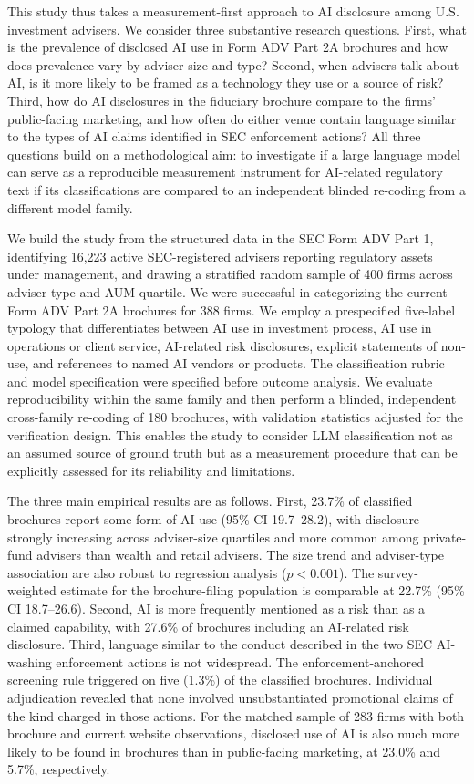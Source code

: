 \documentclass[utf8]{FrontiersinHarvard}
\begin{document}
This study thus takes a measurement-first approach to AI disclosure among U.S. investment advisers. We consider three substantive research questions. First, what is the prevalence of disclosed AI use in Form ADV Part 2A brochures and how does prevalence vary by adviser size and type? Second, when advisers talk about AI, is it more likely to be framed as a technology they use or a source of risk? Third, how do AI disclosures in the fiduciary brochure compare to the firms' public-facing marketing, and how often do either venue contain language similar to the types of AI claims identified in SEC enforcement actions? All three questions build on a methodological aim: to investigate if a large language model can serve as a reproducible measurement instrument for AI-related regulatory text if its classifications are compared to an independent blinded re-coding from a different model family.

We build the study from the structured data in the SEC Form ADV Part 1, identifying 16{,}223 active SEC-registered advisers reporting regulatory assets under management, and drawing a stratified random sample of 400 firms across adviser type and AUM quartile. We were successful in categorizing the current Form ADV Part 2A brochures for 388 firms. We employ a prespecified five-label typology that differentiates between AI use in investment process, AI use in operations or client service, AI-related risk disclosures, explicit statements of non-use, and references to named AI vendors or products. The classification rubric and model specification were specified before outcome analysis. We evaluate reproducibility within the same family and then perform a blinded, independent cross-family re-coding of 180 brochures, with validation statistics adjusted for the verification design. This enables the study to consider LLM classification not as an assumed source of ground truth but as a measurement procedure that can be explicitly assessed for its reliability and limitations.

The three main empirical results are as follows. First, 23.7\% of classified brochures report some form of AI use (95\% CI 19.7--28.2), with disclosure strongly increasing across adviser-size quartiles and more common among private-fund advisers than wealth and retail advisers. The size trend and adviser-type association are also robust to regression analysis ($p < 0.001$). The survey-weighted estimate for the brochure-filing population is comparable at 22.7\% (95\% CI 18.7--26.6). Second, AI is more frequently mentioned as a risk than as a claimed capability, with 27.6\% of brochures including an AI-related risk disclosure. Third, language similar to the conduct described in the two SEC AI-washing enforcement actions is not widespread. The enforcement-anchored screening rule triggered on five (1.3\%) of the classified brochures. Individual adjudication revealed that none involved unsubstantiated promotional claims of the kind charged in those actions. For the matched sample of 283 firms with both brochure and current website observations, disclosed use of AI is also much more likely to be found in brochures than in public-facing marketing, at 23.0\% and 5.7\%, respectively.
\end{document}
